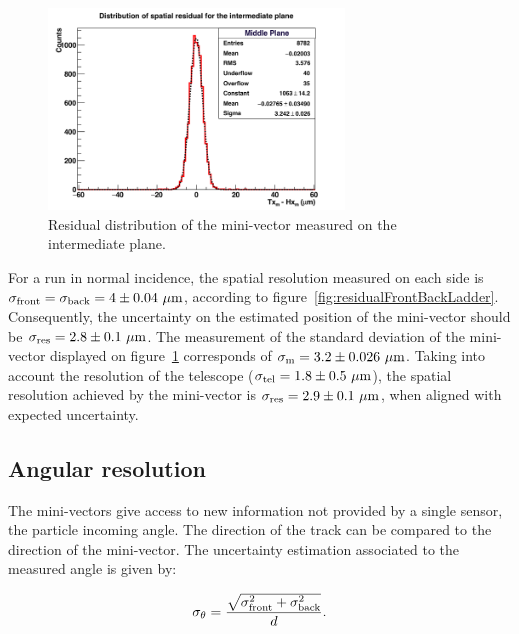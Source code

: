     \begin{figure}[!h]
      \centering
      \includegraphics[width = 0.7\textwidth]{Pictures/deformation/hDiffPosX_226056.png}
      \caption{Residual distribution of the mini-vector measured on the intermediate plane.}
      \label{fig:residualMV}
    \end{figure}

    For a run in normal incidence, the spatial resolution measured on each side is $\sigma_{\rm{front}} = \sigma_{\rm{back}} = 4 \pm 0.04~\rm{\mu m}$, according to figure~\ref{fig:residualFrontBackLadder}.
    Consequently, the uncertainty on the estimated position of the mini-vector should be $\sigma_{\rm{res}} = 2.8 \pm 0.1~\rm{\mu m}$.
    The measurement of the standard deviation of the mini-vector displayed on figure~\ref{fig:residualMV} corresponds of $\sigma_{\rm{m}} = 3.2 \pm 0.026 ~\rm{\mu m}$.
    Taking into account the resolution of the telescope ($\sigma_{\rm{tel}} = 1.8 \pm 0.5~\rm{\mu m}$), the spatial resolution achieved by the mini-vector is $\sigma_{\rm{res}} = 2.9 \pm 0.1~\rm{\mu m}$, when aligned with expected uncertainty.

   \subsection{Angular resolution}

   The mini-vectors give access to new information not provided by a single sensor, the particle incoming angle.
   The direction of the track can be compared to the direction of the mini-vector.
   The uncertainty estimation associated to the measured angle is given by:

   \begin{equation}
     \sigma_{\theta} = \frac{\sqrt{\sigma_{\rm{front}}^2 + \sigma_{\rm{back}}^2}}{d}.
     \label{eq:angularResolution}
   \end{equation}

